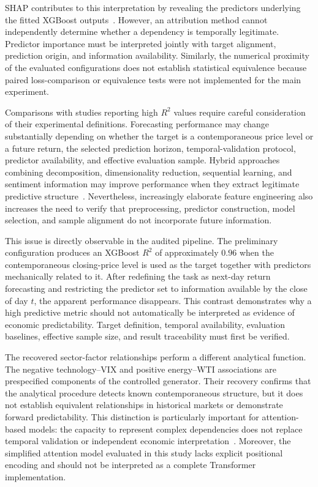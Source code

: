 \documentclass[utf8]{FrontiersinHarvard} %
\begin{document}
SHAP contributes to this interpretation by revealing the predictors underlying the fitted XGBoost outputs~\citep{Lundberg2017shap}. However, an attribution method cannot independently determine whether a dependency is temporally legitimate. Predictor importance must be interpreted jointly with target alignment, prediction origin, and information availability. Similarly, the numerical proximity of the evaluated configurations does not establish statistical equivalence because paired loss-comparison or equivalence tests were not implemented for the main experiment.

Comparisons with studies reporting high \(R^2\) values require careful consideration of their experimental definitions. Forecasting performance may change substantially depending on whether the target is a contemporaneous price level or a future return, the selected prediction horizon, temporal-validation protocol, predictor availability, and effective evaluation sample. Hybrid approaches combining decomposition, dimensionality reduction, sequential learning, and sentiment information may improve performance when they extract legitimate predictive structure~\citep{Srijiranon2022}. Nevertheless, increasingly elaborate feature engineering also increases the need to verify that preprocessing, predictor construction, model selection, and sample alignment do not incorporate future information.

This issue is directly observable in the audited pipeline. The preliminary configuration produces an XGBoost \(R^2\) of approximately \(0.96\) when the contemporaneous closing-price level is used as the target together with predictors mechanically related to it. After redefining the task as next-day return forecasting and restricting the predictor set to information available by the close of day \(t\), the apparent performance disappears. This contrast demonstrates why a high predictive metric should not automatically be interpreted as evidence of economic predictability. Target definition, temporal availability, evaluation baselines, effective sample size, and result traceability must first be verified.

The recovered sector-factor relationships perform a different analytical function. The negative technology--VIX and positive energy--WTI associations are prespecified components of the controlled generator. Their recovery confirms that the analytical procedure detects known contemporaneous structure, but it does not establish equivalent relationships in historical markets or demonstrate forward predictability. This distinction is particularly important for attention-based models: the capacity to represent complex dependencies does not replace temporal validation or independent economic interpretation~\citep{Zhang2022transformer}. Moreover, the simplified attention model evaluated in this study lacks explicit positional encoding and should not be interpreted as a complete Transformer implementation.
\end{document}
